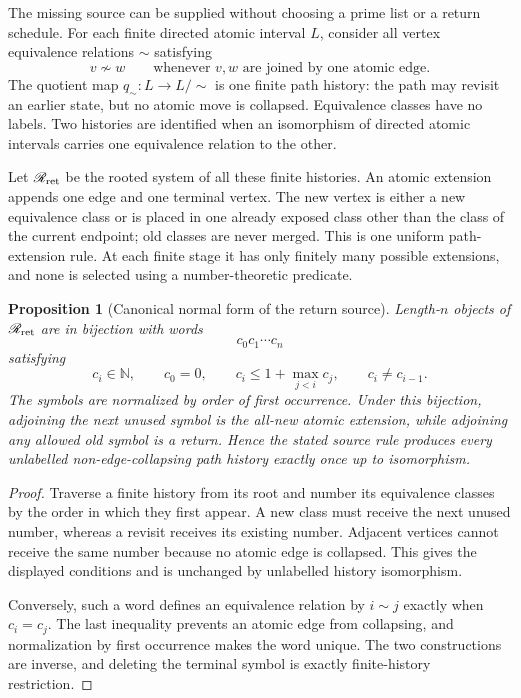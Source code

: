 \documentclass[11pt]{article}
\newtheorem{proposition}[theorem]{Proposition}
\begin{document}
The missing source can be supplied without choosing a prime list or a return
schedule.  For each finite directed atomic interval \(L\), consider all vertex
equivalence relations \(\sim\) satisfying
\[
v\not\sim w
\qquad
\text{whenever \(v,w\) are joined by one atomic edge.}
\]
The quotient map \(q_\sim:L\to L/{\sim}\) is one finite path history: the path
may revisit an earlier state, but no atomic move is collapsed.  Equivalence
classes have no labels.  Two histories are identified when an isomorphism of
directed atomic intervals carries one equivalence relation to the other.

Let \(\mathscr R_{\rm ret}\) be the rooted system of all these finite histories.
An atomic extension appends one edge and one terminal vertex.  The new vertex
is either a new equivalence class or is placed in one already exposed class
other than the class of the current endpoint; old classes are never merged.
This is one uniform path-extension rule.  At each finite stage it has only
finitely many possible extensions, and none is selected using a number-theoretic
predicate.

\begin{proposition}[Canonical normal form of the return source]
\label{prop:return-normal-form}
Length-\(n\) objects of \(\mathscr R_{\rm ret}\) are in bijection with words
\[
c_0c_1\cdots c_n
\]
satisfying
\[
c_i\in\mathbb N,
\qquad
c_0=0,
\qquad
c_i\le 1+\max_{j<i}c_j,
\qquad
c_i\ne c_{i-1}.
\]
The symbols are normalized by order of first occurrence.  Under this
bijection, adjoining the next unused symbol is the all-new atomic extension,
while adjoining any allowed old symbol is a return.  Hence the stated source
rule produces every unlabelled non-edge-collapsing path history exactly once
up to isomorphism.
\end{proposition}

\begin{proof}
Traverse a finite history from its root and number its equivalence classes by
the order in which they first appear.  A new class must receive the next unused
number, whereas a revisit receives its existing number.  Adjacent vertices
cannot receive the same number because no atomic edge is collapsed.  This
gives the displayed conditions and is unchanged by unlabelled history
isomorphism.

Conversely, such a word defines an equivalence relation by
\(i\sim j\) exactly when \(c_i=c_j\).  The last inequality prevents an atomic
edge from collapsing, and normalization by first occurrence makes the word
unique.  The two constructions are inverse, and deleting the terminal symbol
is exactly finite-history restriction.
\end{proof}
\end{document}

